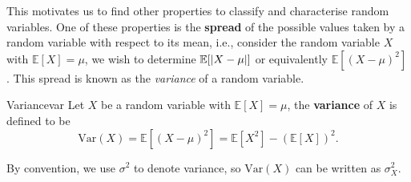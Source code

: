 \documentclass[math]{amznotes}
\theoremstyle{remark}
\newcommand{\0}{\mathbf{0}}
\newcommand{\1}{\mathbf{1}}
\begin{document}
This motivates us to find other properties to classify and characterise random variables. One of these properties is the \textbf{spread} of the possible values taken by a random variable with respect to its mean, i.e., consider the random variable $X$ with $\mathbb{E}[X] = \mu$, we wish to determine $\mathbb{E}[{\left\lvert {X - \mu} \right\rvert}]$ or equivalently $\mathbb{E}[(X - \mu)^2]$. This spread is known as the \textit{variance} of a random variable.
\begin{dfnbox}{Variance}{var}
    Let $X$ be a random variable with $\mathbb{E}[X] = \mu$, the {\color{red} \textbf{variance}} of $X$ is defined to be
    \begin{equation*}
        \mathrm{Var}(X) = \mathbb{E}[(X - \mu)^2] = \mathbb{E}[X^2] - (\mathbb{E}[X])^2.
    \end{equation*}
\end{dfnbox}
By convention, we use $\sigma^2$ to denote variance, so $\mathrm{Var}(X)$ can be written as $\sigma_X^2$.
\end{document}
